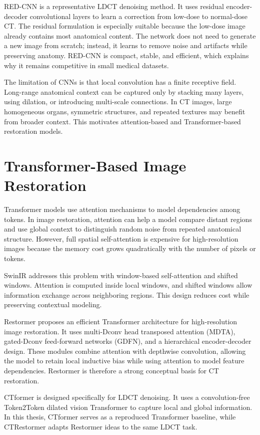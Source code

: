 \documentclass[12pt,a4paper]{report}
\begin{document}
RED-CNN is a representative LDCT denoising method. It uses residual encoder-decoder convolutional layers to learn a correction from low-dose to normal-dose CT. The residual formulation is especially suitable because the low-dose image already contains most anatomical content. The network does not need to generate a new image from scratch; instead, it learns to remove noise and artifacts while preserving anatomy. RED-CNN is compact, stable, and efficient, which explains why it remains competitive in small medical datasets.

The limitation of CNNs is that local convolution has a finite receptive field. Long-range anatomical context can be captured only by stacking many layers, using dilation, or introducing multi-scale connections. In CT images, large homogeneous organs, symmetric structures, and repeated textures may benefit from broader context. This motivates attention-based and Transformer-based restoration models.

\section{Transformer-Based Image Restoration}

Transformer models use attention mechanisms to model dependencies among tokens. In image restoration, attention can help a model compare distant regions and use global context to distinguish random noise from repeated anatomical structure. However, full spatial self-attention is expensive for high-resolution images because the memory cost grows quadratically with the number of pixels or tokens.

SwinIR addresses this problem with window-based self-attention and shifted windows. Attention is computed inside local windows, and shifted windows allow information exchange across neighboring regions. This design reduces cost while preserving contextual modeling.

Restormer proposes an efficient Transformer architecture for high-resolution image restoration. It uses multi-Dconv head transposed attention (MDTA), gated-Dconv feed-forward networks (GDFN), and a hierarchical encoder-decoder design. These modules combine attention with depthwise convolution, allowing the model to retain local inductive bias while using attention to model feature dependencies. Restormer is therefore a strong conceptual basis for CT restoration.

CTformer is designed specifically for LDCT denoising. It uses a convolution-free Token2Token dilated vision Transformer to capture local and global information. In this thesis, CTformer serves as a reproduced Transformer baseline, while CTRestormer adapts Restormer ideas to the same LDCT task.
\end{document}
